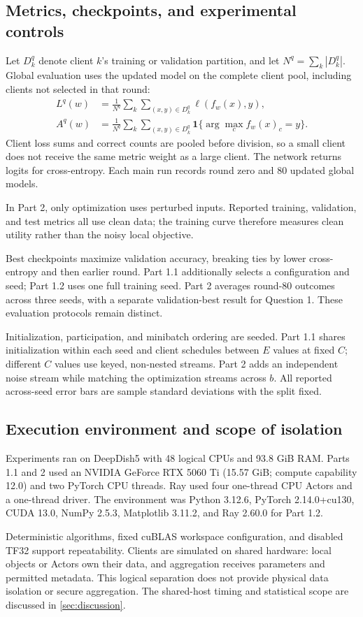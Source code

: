 \subsection{Metrics, checkpoints, and experimental controls}
Let $D_k^q$ denote client $k$'s training or validation partition, and let $N^q=\sum_k|D_k^q|$. Global evaluation uses the updated model on the complete client pool, including clients not selected in that round:
\begin{align}
 L^q(w)&=\frac{1}{N^q}\sum_k\sum_{(x,y)\in D_k^q}\ell(f_w(x),y),\label{eq:loss}\\
 A^q(w)&=\frac{1}{N^q}\sum_k\sum_{(x,y)\in D_k^q}\mathbf{1}\{\arg\max_c f_w(x)_c=y\}.\label{eq:accuracy}
\end{align}
Client loss sums and correct counts are pooled before division, so a small client does not receive the same metric weight as a large client. The network returns logits for cross-entropy. Each main run records round zero and 80 updated global models.

In Part 2, only optimization uses perturbed inputs. Reported training, validation, and test metrics all use clean data; the training curve therefore measures clean utility rather than the noisy local objective.

Best checkpoints maximize validation accuracy, breaking ties by lower cross-entropy and then earlier round. Part 1.1 additionally selects a configuration and seed; Part 1.2 uses one full training seed. Part 2 averages round-80 outcomes across three seeds, with a separate validation-best result for Question 1. These evaluation protocols remain distinct.

Initialization, participation, and minibatch ordering are seeded. Part 1.1 shares initialization within each seed and client schedules between $E$ values at fixed $C$; different $C$ values use keyed, non-nested streams. Part 2 adds an independent noise stream while matching the optimization streams across $b$. All reported across-seed error bars are sample standard deviations with the split fixed.

\subsection{Execution environment and scope of isolation}
Experiments ran on DeepDish5 with 48 logical CPUs and 93.8 GiB RAM. Parts 1.1 and 2 used an NVIDIA GeForce RTX 5060 Ti (15.57 GiB; compute capability 12.0) and two PyTorch CPU threads. Ray used four one-thread CPU Actors and a one-thread driver. The environment was Python 3.12.6, PyTorch 2.14.0+cu130, CUDA 13.0, NumPy 2.5.3, Matplotlib 3.11.2, and Ray 2.60.0 for Part 1.2.

Deterministic algorithms, fixed cuBLAS workspace configuration, and disabled TF32 support repeatability. Clients are simulated on shared hardware: local objects or Actors own their data, and aggregation receives parameters and permitted metadata. This logical separation does not provide physical data isolation or secure aggregation. The shared-host timing and statistical scope are discussed in \cref{sec:discussion}.




